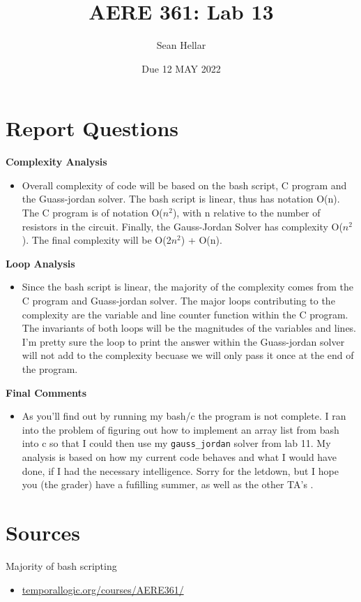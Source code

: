 \documentclass{article}
\title{AERE 361: Lab 13}
\date{Due 12 MAY 2022}
\author{Sean Hellar}
\begin{document}
\maketitle
\newpage

\section{Report Questions}

\textbf{Complexity Analysis}
\begin{itemize}
	\item{Overall complexity of code will be based on the bash script, C program and the Guass-jordan solver. The bash script is linear, thus has notation O(n). The C program is of notation O(${n^2}$), with n relative to the number of resistors in the circuit. Finally, the Gauss-Jordan Solver has complexity O(${n^2}$). The final complexity will be O(2${n^2}$) + O(n).}
\end{itemize}


\textbf{Loop Analysis}
\begin{itemize}
	\item{Since the bash script is linear, the majority of the complexity comes from the C program and Guass-jordan solver. The major loops contributing to the complexity are the variable and line counter function within the C program. The invariants of both loops will be the magnitudes of the variables and lines. I'm pretty sure the loop to print the answer within the Guass-jordan solver will not add to the complexity becuase we will only pass it once at the end of the program.}
\end{itemize}

\textbf{Final Comments}
\begin{itemize}
	\item{As you'll find out by running my bash/c the program is not complete. I ran into the problem of figuring out how to implement an array list from bash into c so that I could then use my \texttt{gauss\_jordan} solver from lab 11. My analysis is based on how my current code behaves and what I would have done, if I had the necessary intelligence. Sorry for the letdown, but I hope you (the grader) have a fufilling summer, as well as the other TA's \smiley{}.}
\end{itemize}

\newpage

\section{Sources}
Majority of bash scripting 
\begin{itemize}
	\item{\url{temporallogic.org/courses/AERE361/}}
\end{itemize}
\end{document}
